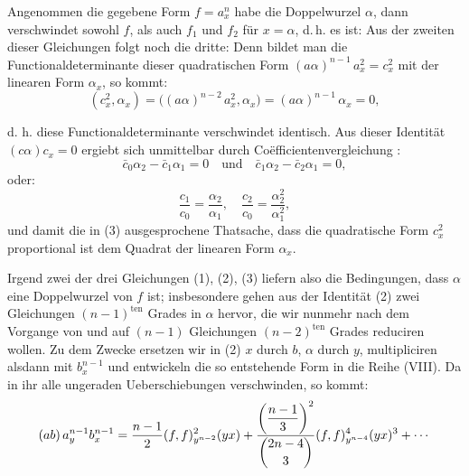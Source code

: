Angenommen die gegebene Form $f = a_x^n$ habe die Doppelwurzel
$\alpha$, dann verschwindet sowohl $f$, als auch $f_1$ und $f_2$ für $x = \alpha$, d.\,h.
es ist:
Aus der zweiten dieser Gleichungen folgt noch die dritte:
Denn bildet man die Functionaldeterminante dieser quadratischen
Form $(a\alpha)^{n-1}\,a_x^2 = c_x^2$ mit der linearen Form $\alpha_x$, so kommt:
\[
(c_x^2, \alpha_x) = \big((a\alpha)^{n-2}\,a_x^2, \alpha_x\big) = (a\alpha)^{n-1}\,\alpha_x = 0,
\]


d. h. diese Functionaldeterminante verschwindet identisch. Aus dieser
Identität $(c\alpha)c_x = 0$ ergiebt sich unmittelbar durch Co\"efficientenvergleichung
:
\[
\bar{c}_0\alpha_2 - \bar{c}_1\alpha_1 = 0 \quad \text{und} \quad \bar{c}_1\alpha_2 - \bar{c}_2\alpha_1 = 0,
\]
oder:
\[
\frac{c_1}{c_0} = \frac{\alpha_2}{\alpha_1}, \quad \frac{c_2}{c_0} = \frac{\alpha_2^2}{\alpha_1^2},
\]
und damit die in (3) ausgesprochene Thatsache, dass die quadratische
Form $c_x^2$ proportional ist dem Quadrat der linearen Form $\alpha_x$.

Irgend zwei der drei Gleichungen (1), (2), (3) liefern also die
Bedingungen, dass $\alpha$ eine Doppelwurzel von $f$ ist; insbesondere gehen
aus der Identität (2) zwei Gleichungen $(n-1)^{\text{ten}}$ Grades in $\alpha$ hervor,
die wir nunmehr nach dem Vorgange von  und  auf
$(n-1)$ Gleichungen $(n-2)^{\text{ten}}$ Grades reduciren wollen. Zu dem Zwecke
ersetzen wir in (2) $x$ durch $b$, $\alpha$ durch $y$, multipliciren alsdann mit
$b_x^{n-1}$ und entwickeln die so entstehende Form in die Reihe (VIII).
Da in ihr alle ungeraden Ueberschiebungen verschwinden, so kommt:
\[
(ab)\,a_y^{n-1}b_x^{n-1} = \frac{n-1}{2}(f,f)^2_{y^{n-2}}(yx) + \frac{\left(\dfrac{n-1}{3}\right)^2}{\dbinom{2n-4}{3}}(f,f)^4_{y^{n-4}}(yx)^3 + \cdots
\]

